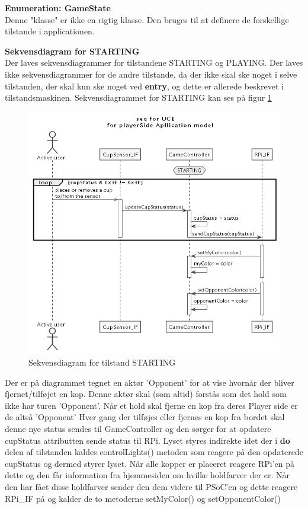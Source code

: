 \documentclass[Arkitektur/System_main.tex]{subfiles}
\begin{document}
{\large\textbf{Enumeration:  GameState}}\\
Denne "klasse" er ikke en rigtig klasse. Den bruges til at definere de forskellige tilstande i applicationen. 

{\large\textbf{Sekvensdiagram for STARTING}}\\
Der laves sekvensdiagrammer for tilstandene STARTING og PLAYING. Der laves ikke sekvensdiagrammer for de andre tilstande, da der ikke skal ske noget i selve tilstanden, der skal kun ske noget ved \textbf{entry}, og dette er allerede beskrevet i tilstandsmaskinen. Sekvensdiagrammet for STARTING kan ses på figur \ref{fig:playerSide_STARTING_SD}

\begin{figure}[H]
    \centering
    \includegraphics[width=\textwidth]{Arkitektur/Softwarearkitektur/Applikationsmodel/PlayerSide/graphics/UC1_sequence.png}
    \caption{Sekvensdiagram for tilstand STARTING}
    \label{fig:playerSide_STARTING_SD}
\end{figure}
Der er på diagrammet tegnet en aktør 'Opponent' for at vise hvornår der bliver fjernet/tilføjet en kop. Denne aktør skal (som altid) forstås som det hold som ikke har turen 'Opponent'. Når et hold skal fjerne en kop fra deres Player side er de altså 'Opponent' 
Hver gang der tilføjes eller fjernes en kop fra bordet skal denne nye status sendes til GameController og den sørger for at opdatere cupStatus attributten sende status til RPi. Lyset styres indirekte idet der i \textbf{do} delen af tilstanden kaldes controlLights() metoden som reagere på den opdaterede cupStatus og dermed styrer lyset. Når alle kopper er placeret reagere RPi'en på dette og den får information fra hjemmesiden om hvilke holdfarver der er. Når den har fået disse holdfarver sender den dem videre til PSoC'en og dette reagere RPi\_IF på og kalder de to metoderne setMyColor() og setOpponentColor()
\end{document}
